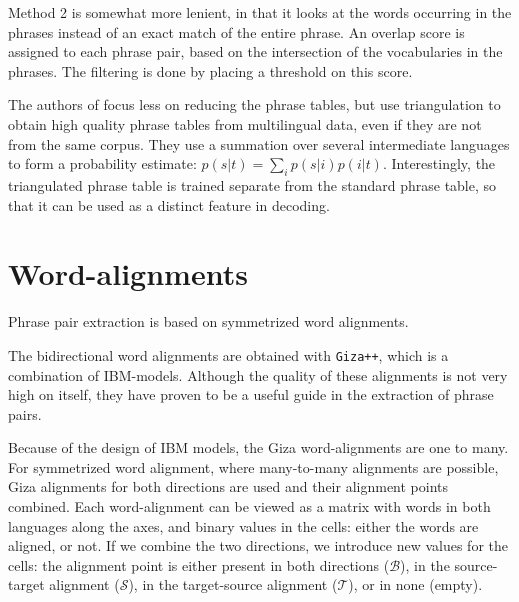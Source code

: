 \documentclass[11pt]{article}
\begin{document}
Method 2 is somewhat more lenient, in that it looks at the words occurring in the phrases instead of an exact match of the entire phrase. An overlap score is assigned to each phrase pair, based on the intersection of the vocabularies in the phrases. The filtering is done by placing a threshold on this score.

The authors of \cite{cohn} focus less on reducing the phrase tables, but use triangulation to obtain high quality phrase tables from multilingual data, even if they are not from the same corpus. They use a summation over several intermediate languages to form a probability estimate: $p(s|t)=\sum_i p(s|i)p(i|t)$. Interestingly, the triangulated phrase table is trained separate from the standard phrase table, so that it can be used as a distinct feature in decoding.




\section{Word-alignments}
Phrase pair extraction is based on symmetrized word alignments. 

The bidirectional word alignments are obtained with {\tt Giza++}, which is a combination of IBM-models. Although the quality of these alignments is not very high on itself, they have proven to be a useful guide in the extraction of phrase pairs. 


 Because of the design of IBM models, the Giza word-alignments are one to many. For symmetrized word alignment, where many-to-many alignments are possible, Giza alignments for both directions are used and their alignment points combined. Each word-alignment can be viewed as a matrix with words in both languages along the axes, and binary values in the cells: either the words are aligned, or not. If we combine the two directions, we introduce new values for the cells: the alignment point is either present in both directions ($\mathcal B$), in the source-target alignment ($\mathcal S$), in the target-source alignment ($\mathcal T$), or in none (empty).
\end{document}
